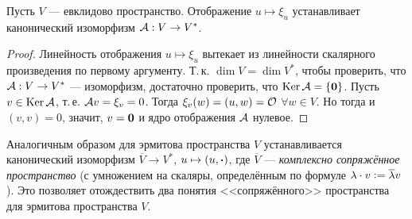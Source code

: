 \begin{theorem}
    Пусть $V$ --- евклидово пространство. Отображение $u \mapsto \xi_u$ устанавливает канонический изоморфизм $\mathcal{A}: V \to V^\ast$.
\end{theorem}

\begin{proof}
    Линейность отображения $u \mapsto \xi_u$ вытекает из линейности скалярного произведения по первому аргументу. Т.\,к. $\dim V = \dim V^\ast$, чтобы проверить, что $\mathcal{A}: V \to V^\ast$ --- изоморфизм, достаточно проверить, что $\operatorname{Ker}\mathcal{A} = \{\boldsymbol{0}\}$. Пусть $v \in \operatorname{Ker}\mathcal{A}$, т.\,е. $\mathcal{A} v = \xi_v = 0$. Тогда $\xi_v(w) = (u, w) = \mathcal{O}$ $\forall w \in V$. Но тогда и $(v, v) = 0$, значит, $v = \boldsymbol{0}$ и ядро отображения $\mathcal{A}$ нулевое.
\end{proof}

Аналогичным образом для эрмитова пространства $V$ устанавливается канонический изоморфизм $\overline{V} \to V^\ast$, $u \mapsto (u, \boldsymbol{\cdot})$, где $\overline{V}$ --- \textit{комплексно сопряжённое пространство} (с умножением на скаляры, определённым по формуле $\lambda \cdot v \vcentcolon = \overline{\lambda}v$). Это позволяет отождествить два понятия <<сопряжённого>> пространства для эрмитова пространства $V$.

